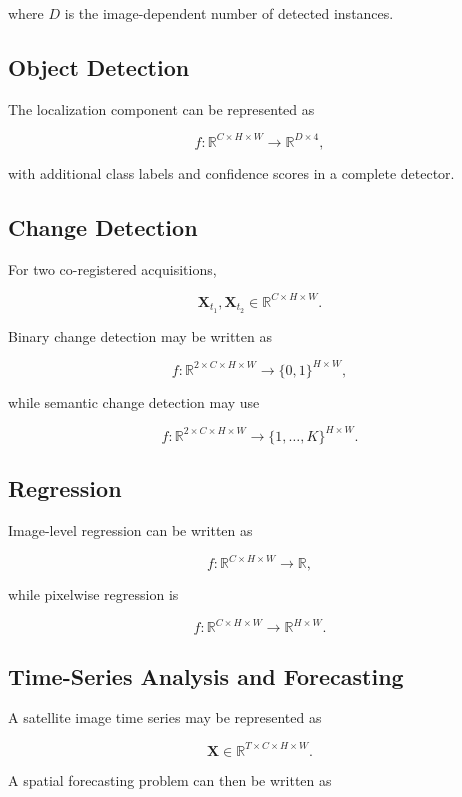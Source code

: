 \documentclass[11pt,a4paper]{article}
\begin{document}
where \(D\) is the image-dependent number of detected instances.

\subsection{Object Detection}

The localization component can be represented as

\[
f:
\mathbb{R}^{C\times H\times W}
\rightarrow
\mathbb{R}^{D\times 4},
\]

with additional class labels and confidence scores in a complete detector.

\subsection{Change Detection}

For two co-registered acquisitions,

\[
\mathbf{X}_{t_1},\mathbf{X}_{t_2}
\in
\mathbb{R}^{C\times H\times W}.
\]

Binary change detection may be written as

\[
f:
\mathbb{R}^{2\times C\times H\times W}
\rightarrow
\{0,1\}^{H\times W},
\]

while semantic change detection may use

\[
f:
\mathbb{R}^{2\times C\times H\times W}
\rightarrow
\{1,\ldots,K\}^{H\times W}.
\]

\subsection{Regression}

Image-level regression can be written as

\[
f:
\mathbb{R}^{C\times H\times W}
\rightarrow
\mathbb{R},
\]

while pixelwise regression is

\[
f:
\mathbb{R}^{C\times H\times W}
\rightarrow
\mathbb{R}^{H\times W}.
\]

\subsection{Time-Series Analysis and Forecasting}

A satellite image time series may be represented as

\[
\mathbf{X}
\in
\mathbb{R}^{T\times C\times H\times W}.
\]

A spatial forecasting problem can then be written as
\end{document}
